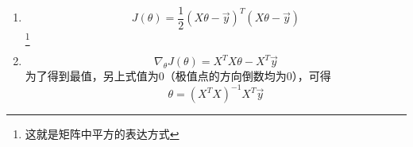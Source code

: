 \begin{enumerate}
	\item 
	\begin{equation}
		J(\theta) = \frac{1}{2}(X\theta - \vec{y})^T(X\theta - \vec{y})
	\end{equation}
	\footnote{这就是矩阵中平方的表达方式}

	\item 
	\begin{equation}
		\nabla_{\theta}J(\theta) = X^TX\theta - X^T \vec{y}
	\end{equation}
	为了得到最值，另上式值为0（极值点的方向倒数均为0），可得
	\begin{equation}
		\theta = (X^TX)^{-1}X^T\vec{y}
	\end{equation}






\end{enumerate}



























